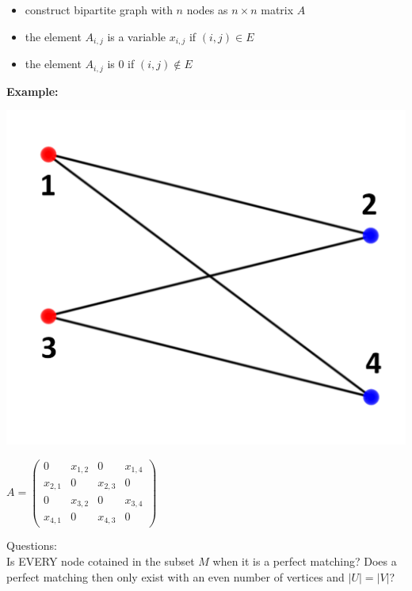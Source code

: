 \documentclass[a4]{scrartcl}
\begin{document}
\begin{itemize}
\item construct bipartite graph with $n$ nodes as $n \times n$ matrix $A$
\item the element $A_{i,j}$ is a variable $x_{i,j}$ if $(i,j) \in E$
\item the element $A_{i,j}$ is 0 if $(i,j) \notin E$
\end{itemize}

\textbf{Example: }

\begin{minipage}{0.50\textwidth}

\begin{center}
\includegraphics[scale=0.28]{v1.png}
\end{center}

\end{minipage}
\begin{minipage}{0.50\textwidth}


$ A = \begin{pmatrix}
0 & x_{1,2} & 0 & x_{1,4} \\
x_{2,1} & 0 & x_{2,3} & 0 \\
0 & x_{3,2} & 0 & x_{3,4} \\
x_{4,1} & 0 & x_{4,3} & 0
\end{pmatrix}$

\end{minipage}

\color{violet} Questions: \ \\
Is EVERY node cotained in the subset $M$ when it is a perfect matching? Does a perfect matching then only exist with an even number of vertices and $|U| = |V|$? \ \\
\color{black}
\end{document}
